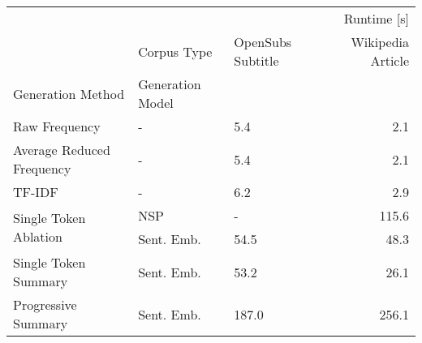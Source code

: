 \begin{tabular}{lllr}
\toprule
 &  & \multicolumn{2}{r}{Runtime [s]} \\
 & Corpus Type & OpenSubs Subtitle & Wikipedia Article \\
Generation Method & Generation Model &  &  \\
\midrule
Raw Frequency & - & 5.4 & 2.1 \\
\cline{1-4}
Average Reduced Frequency & - & 5.4 & 2.1 \\
\cline{1-4}
TF-IDF & - & 6.2 & 2.9 \\
\cline{1-4}
\multirow[t]{2}{*}{Single Token Ablation} & NSP & - & 115.6 \\
 & Sent. Emb. & 54.5 & 48.3 \\
\cline{1-4}
Single Token Summary & Sent. Emb. & 53.2 & 26.1 \\
\cline{1-4}
Progressive Summary & Sent. Emb. & 187.0 & 256.1 \\
\cline{1-4}
\bottomrule
\end{tabular}
